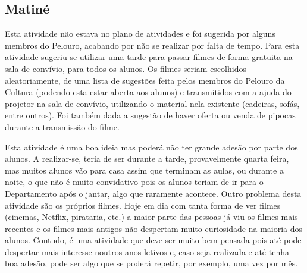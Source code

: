 
\subsection{Matiné}

Esta atividade não estava no plano de atividades e foi sugerida por alguns membros do Pelouro, acabando por não se realizar por falta de tempo. Para esta atividade sugeriu-se utilizar uma tarde para passar filmes de forma gratuita na sala de convívio, para todos os alunos. Os filmes seriam escolhidos aleatoriamente, de uma lista de sugestões feita pelos membros do Pelouro da Cultura (podendo esta estar aberta aos alunos) e transmitidos com a ajuda do projetor na sala de convívio, utilizando o material nela existente (cadeiras, sofás, entre outros). Foi também dada a sugestão de haver oferta ou venda de pipocas durante a transmissão do filme.

Esta atividade é uma boa ideia mas poderá não ter grande adesão por parte dos alunos. A realizar-se, teria de ser durante a tarde, provavelmente quarta feira, mas muitos alunos vão para casa assim que terminam as aulas, ou durante a noite, o que não é muito convidativo pois os alunos teriam de ir para o Departamento após o jantar, algo que raramente acontece. Outro problema desta atividade são os próprios filmes. Hoje em dia com tanta forma de ver filmes (cinemas, Netflix, pirataria, etc.) a maior parte das pessoas já viu os filmes mais recentes e os filmes mais antigos não despertam muito curiosidade na maioria dos alunos. Contudo, é uma atividade que deve ser muito bem pensada pois até pode despertar mais interesse noutros anos letivos e, caso seja realizada e até tenha boa adesão, pode ser algo que se poderá repetir, por exemplo, uma vez por mês.
